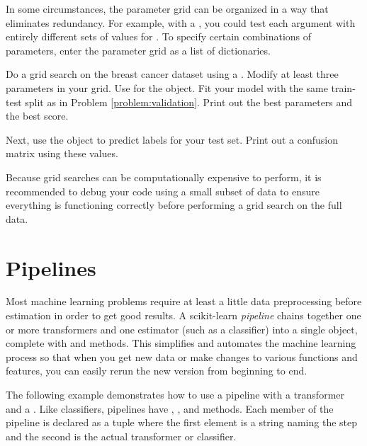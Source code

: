 In some circumstances, the parameter grid can be organized in a way that eliminates redundancy.
For example, with a , you could test each  argument with entirely different sets of values for .
To specify certain combinations of parameters, enter the parameter grid as a list of dictionaries.

\begin{problem} %
Do a grid search on the breast cancer dataset using a .
Modify at least three parameters in your grid.
Use   for the  object.
Fit your model with the same train-test split as in Problem \ref{problem:validation}.
Print out the best parameters and the best score.

Next, use the  object to predict labels for your test set.
Print out a confusion matrix using these values.
\label{problem:gridsearch}
\end{problem}

\begin{warn}
Because grid searches can be computationally expensive to perform, it is recommended to debug your code using a small subset of data to ensure everything is functioning correctly before performing a grid search on the full data.
\end{warn}

\section*{Pipelines} %

Most machine learning problems require at least a little data preprocessing before estimation in order to get good results.
A scikit-learn \emph{pipeline} chains together one or more transformers and one estimator (such as a classifier) into a single object, complete with  and  methods.
This simplifies and automates the machine learning process so that when you get new data or make changes to various functions and features, you can easily rerun the new version from beginning to end.

The following example demonstrates how to use a pipeline with a  transformer and a .
Like classifiers, pipelines have , , and  methods.
Each member of the pipeline is declared as a tuple where the first element is a string naming the step and the second is the actual transformer or classifier.

